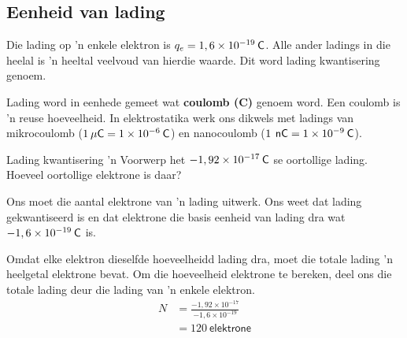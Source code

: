 \subsection{Eenheid van lading}

Die lading op 'n enkele elektron is ${q}_{e}=1,6\times{10}^{-19}\phantom{\rule{2pt}{0ex}}\mathsf{C}$. Alle ander ladings in die heelal is 'n heeltal veelvoud van hierdie waarde. Dit word lading kwantisering genoem.



Lading word in eenhede gemeet wat \textbf{coulomb (C)} genoem word. Een coulomb is 'n reuse hoeveelheid. In elektrostatika werk ons dikwels met ladings van mikrocoulomb ($1\phantom{\rule{2pt}{0ex}}\mu\mathsf{C}=1\ensuremath{\times}{10}^{-6}\phantom{\rule{2pt}{0ex}}\mathsf{C}$) en nanocoulomb ($1\phantom{\rule{2pt}{0ex}}\phantom{\rule{2pt}{0ex}}\mathsf{nC}=1\ensuremath{\times}{10}^{-9}\phantom{\rule{2pt}{0ex}}\mathsf{C}$). \par

  
\begin{wex}{Lading kwantisering}
{
 'n Voorwerp het $-1,92\ensuremath{\times}{10}^{-17}\phantom{\rule{2pt}{0ex}}\mathsf{C}$ se oortollige lading. Hoeveel oortollige elektrone is daar?
}
{


Ons moet die aantal elektrone van 'n lading uitwerk. Ons weet dat lading gekwantiseerd is en dat elektrone die basis eenheid van lading dra wat $-1,6\ensuremath{\times}{10}^{-19}\phantom{\rule{2pt}{0ex}}\mathsf{C}$ is.



Omdat elke elektron dieselfde hoeveelheidd lading dra, moet die totale lading 'n heelgetal elektrone bevat. Om die hoeveelheid elektrone te bereken, deel ons die totale lading deur die lading van 'n enkele elektron.
\begin{align*}
N &= \frac{-1,92\ensuremath{\times}{10}^{-17}}{-1,6\ensuremath{\times}{10}^{-19}}\\ 
  &= 120~\mathsf{ elektrone}
\end{align*}
}
\end{wex}

